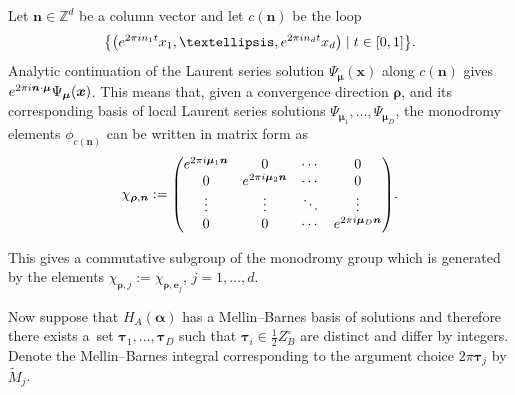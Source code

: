 \documentclass[11pt]{article}
\numberwithin{equation}{section}
\numberwithin{equation}{section}
\begin{document}
Let $\bm{n} \in \mathbb{Z}^d$ be a column vector and let $c(\bm{n})$ be the loop
\begin{gather*}
\big\{\big({\rm e}^{2\pi {\rm i} n_1 t}x_1,\dots,{\rm e}^{2\pi {\rm i} n_d t}x_d\big)\mid t \in [0,1]\big\}.
\end{gather*}
Analytic
continuation of the Laurent series solution $\Psi_{\bm{\mu}}(\bm{x})$ along $c(\bm{n})$
gives ${\rm e}^{2\pi {\rm i} \bm{n} \cdot \bm\mu}\Psi_{\bm\mu}(\bm{x})$. This means that, given a convergence direction $\bm\rho$, and its corresponding basis of local Laurent series solutions
$\Psi_{\bm\mu_1},\dots,\Psi_{\bm\mu_D}$, the monodromy elements $\phi_{c(\bm{n})}$ can be written in matrix form as
\begin{gather*}
\chi_{\bm\rho,\bm{n}} := \begin{pmatrix}{\rm e}^{2\pi {\rm i} \bm\mu_1 \bm{n}} & 0 & \cdots & 0 \\ 0 & {\rm e}^{2\pi {\rm i} \bm\mu_2 \bm{n}} & \cdots & 0 \\ \vdots & \vdots & \ddots & \vdots \\ 0 & 0 & \cdots & {\rm e}^{2\pi {\rm i} \bm\mu_D \bm{n}}\end{pmatrix}\!.
\end{gather*}

This gives a commutative subgroup of the monodromy group which is generated by the elements $\chi_{\bm\rho,j} := \chi_{\bm\rho,\bm{e}_j}$, $j=1,\dots,d$.

Now suppose that $H_{A}(\bm{\alpha})$ has a Mellin--Barnes basis of solutions and therefore
there exists a~set $\bm{\tau}_1,\dots,\bm{\tau}_D$ such that
$\bm{\tau}_i \in \frac{1}{2}Z_B^{\circ}$ are distinct and differ by integers.
Denote the Mellin--Barnes integral corresponding to the argument choice
$2\pi\bm\tau_j$ by $\tilde{M}_j$.
\end{document}
